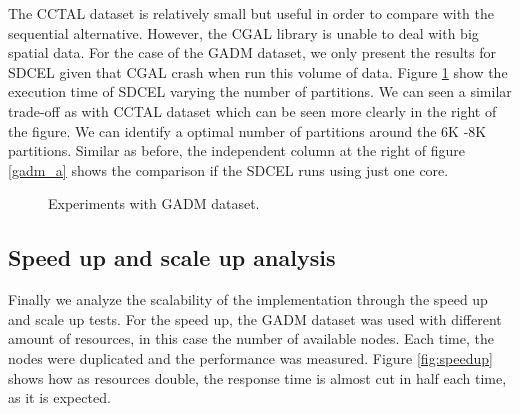 The CCTAL dataset is relatively small but useful in order to compare with the sequential alternative.  However, the CGAL library is unable to deal with big spatial data.  For the case of the GADM dataset, we only present the results for SDCEL given that CGAL crash when run this volume of data.  Figure \ref{fig:gadm} show the execution time of SDCEL varying the number of partitions.  We can seen a similar trade-off as with CCTAL dataset which can be seen more clearly in the right of the figure.  We can identify a optimal number of partitions around the 6K -8K partitions.  Similar as before, the independent column at the right of figure \ref{gadm_a} shows the comparison if the SDCEL runs using just one core.

\begin{figure}[!ht]
    \centering
    \hfill
    \caption{Experiments with GADM dataset.} \label{fig:gadm} 
\end{figure}

\subsection{Speed up and scale up analysis}

Finally we analyze the scalability of the implementation through the speed up and scale up tests.  For the speed up, the GADM dataset was used with different amount of resources, in this case the number of available nodes.  Each time, the nodes were duplicated and the performance was measured.  Figure \ref{fig:speedup} shows  how as resources double, the response time is almost cut in half each time, as it is expected.  

